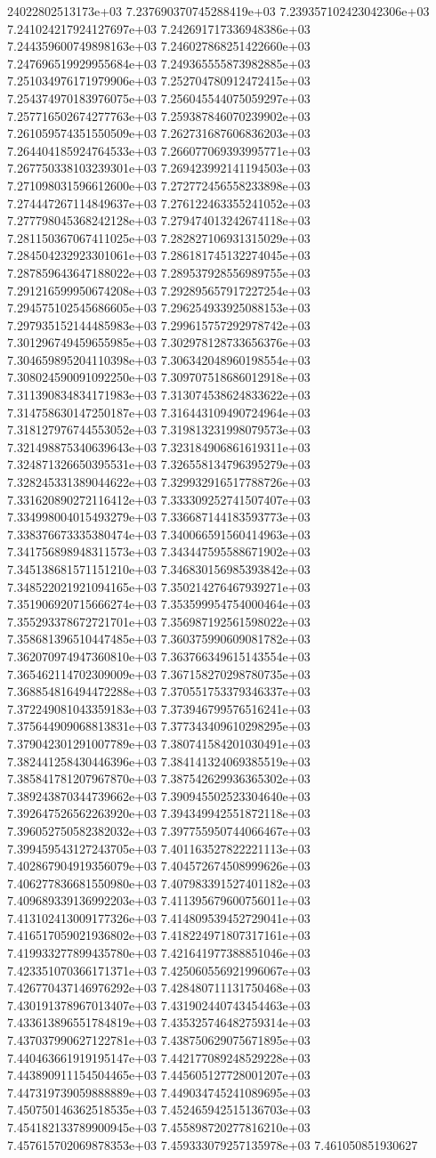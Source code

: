 24022802513173e+03	7.237690370745288419e+03	7.239357102423042306e+03	7.241024217924127697e+03	7.242691717336948386e+03	7.244359600749898163e+03	7.246027868251422660e+03	7.247696519929955684e+03	7.249365555873982885e+03	7.251034976171979906e+03	7.252704780912472415e+03	7.254374970183976075e+03	7.256045544075059297e+03	7.257716502674277763e+03	7.259387846070239902e+03	7.261059574351550509e+03	7.262731687606836203e+03	7.264404185924764533e+03	7.266077069393995771e+03	7.267750338103239301e+03	7.269423992141194503e+03	7.271098031596612600e+03	7.272772456558233898e+03	7.274447267114849637e+03	7.276122463355241052e+03	7.277798045368242128e+03	7.279474013242674118e+03	7.281150367067411025e+03	7.282827106931315029e+03	7.284504232923301061e+03	7.286181745132274045e+03	7.287859643647188022e+03	7.289537928556989755e+03	7.291216599950674208e+03	7.292895657917227254e+03	7.294575102545686605e+03	7.296254933925088153e+03	7.297935152144485983e+03	7.299615757292978742e+03	7.301296749459655985e+03	7.302978128733656376e+03	7.304659895204110398e+03	7.306342048960198554e+03	7.308024590091092250e+03	7.309707518686012918e+03	7.311390834834171983e+03	7.313074538624833622e+03	7.314758630147250187e+03	7.316443109490724964e+03	7.318127976744553052e+03	7.319813231998079573e+03	7.321498875340639643e+03	7.323184906861619311e+03	7.324871326650395531e+03	7.326558134796395279e+03	7.328245331389044622e+03	7.329932916517788726e+03	7.331620890272116412e+03	7.333309252741507407e+03	7.334998004015493279e+03	7.336687144183593773e+03	7.338376673335380474e+03	7.340066591560414963e+03	7.341756898948311573e+03	7.343447595588671902e+03	7.345138681571151210e+03	7.346830156985393842e+03	7.348522021921094165e+03	7.350214276467939271e+03	7.351906920715666274e+03	7.353599954754000464e+03	7.355293378672721701e+03	7.356987192561598022e+03	7.358681396510447485e+03	7.360375990609081782e+03	7.362070974947360810e+03	7.363766349615143554e+03	7.365462114702309009e+03	7.367158270298780735e+03	7.368854816494472288e+03	7.370551753379346337e+03	7.372249081043359183e+03	7.373946799576516241e+03	7.375644909068813831e+03	7.377343409610298295e+03	7.379042301291007789e+03	7.380741584201030491e+03	7.382441258430446396e+03	7.384141324069385519e+03	7.385841781207967870e+03	7.387542629936365302e+03	7.389243870344739662e+03	7.390945502523304640e+03	7.392647526562263920e+03	7.394349942551872118e+03	7.396052750582382032e+03	7.397755950744066467e+03	7.399459543127243705e+03	7.401163527822221113e+03	7.402867904919356079e+03	7.404572674508999626e+03	7.406277836681550980e+03	7.407983391527401182e+03	7.409689339136992203e+03	7.411395679600756011e+03	7.413102413009177326e+03	7.414809539452729041e+03	7.416517059021936802e+03	7.418224971807317161e+03	7.419933277899435780e+03	7.421641977388851046e+03	7.423351070366171371e+03	7.425060556921996067e+03	7.426770437146976292e+03	7.428480711131750468e+03	7.430191378967013407e+03	7.431902440743454463e+03	7.433613896551784819e+03	7.435325746482759314e+03	7.437037990627122781e+03	7.438750629075671895e+03	7.440463661919195147e+03	7.442177089248529228e+03	7.443890911154504465e+03	7.445605127728001207e+03	7.447319739059888889e+03	7.449034745241089695e+03	7.450750146362518535e+03	7.452465942515136703e+03	7.454182133789900945e+03	7.455898720277816210e+03	7.457615702069878353e+03	7.459333079257135978e+03	7.461050851930627